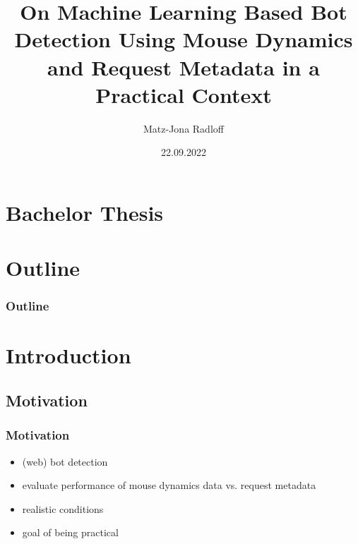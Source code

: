 \documentclass[t,aspectratio=169,table]{beamer}
\title{On Machine Learning Based Bot Detection Using Mouse Dynamics and Request Metadata in a Practical Context}
\author{Matz-Jona Radloff}
\date{22.09.2022} %
\begin{document}

\section{Bachelor Thesis}
\begin{frame}
\maketitle
\end{frame}

\section{Outline}
\begin{frame}[allowframebreaks]
\frametitle{Outline}

\tableofcontents[sections={3-5}]
\framebreak
\tableofcontents[sections={6-20}]

\end{frame}

\section{Introduction}

\subsection{Motivation}
\begin{frame}
\frametitle{Motivation}

\begin{itemize}
    \item (web) bot detection
    \item evaluate performance of mouse dynamics data vs. request metadata
    \item realistic conditions
    \item goal of being practical
\end{itemize}

\end{frame}
\end{document}
